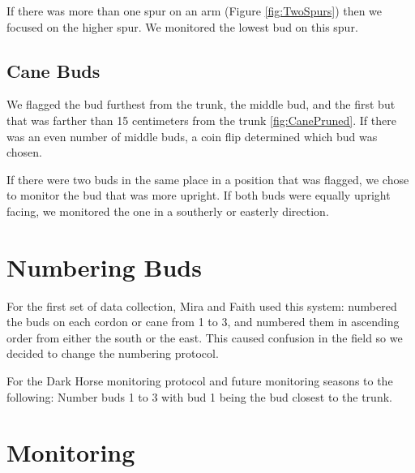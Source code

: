 \documentclass[11pt,letter]{article}
\begin{document}
If there was more than one spur on an arm (Figure \ref{fig:TwoSpurs}) then we focused on the higher spur. We monitored the lowest bud on this spur. 

\subsection{Cane Buds}

We flagged the bud furthest from the trunk, the middle bud, and the first but that was farther than 15 centimeters from the trunk \ref{fig:CanePruned}. If there was an even number of middle buds, a coin flip determined which bud was chosen. 

If there were two buds in the same place in a position that was flagged, we chose to monitor the bud that was more upright. If both buds were equally upright facing, we monitored the one in a southerly or easterly direction. 

\section{Numbering Buds}
For the first set of data collection, Mira and Faith used this system: numbered the buds on each cordon or cane from 1 to 3, and numbered them in ascending order from either the south or the east. This caused confusion in the field so we decided to change the numbering protocol.

For the Dark Horse monitoring protocol and future monitoring seasons to the following:
Number buds 1 to 3 with bud 1 being the bud closest to the trunk. 

\section{Monitoring}
\end{document}
